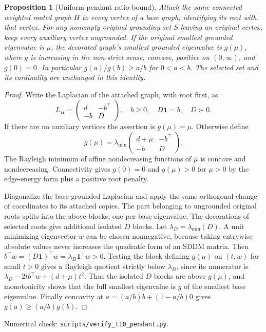 \documentclass[11pt]{article}
\newtheorem{proposition}[theorem]{Proposition}
\newcommand{\ind}{\mathbf 1}
\begin{document}
\begin{proposition}[Uniform pendant ratio bound]
\label{prop:pendantamplification}
Attach the same connected weighted rooted graph $H$ to every
vertex of a base graph, identifying its root with that vertex.
For any nonempty original grounding set $S$ leaving an original
vertex, keep every auxiliary vertex ungrounded. If the original
smallest grounded eigenvalue is $\mu$, the decorated graph's
smallest grounded eigenvalue is $g(\mu)$, where $g$ is increasing
in the non-strict sense, concave, positive on $(0,\infty)$, and
$g(0)=0$. In particular $g(a)/g(b)\geq a/b$ for $0<a<b$.
The selected set and its cardinality are unchanged in this identity.
\end{proposition}
\begin{proof}
Write the Laplacian of the attached graph, with root first, as
\[
 L_H=\begin{pmatrix}d&-b^\top\\-b&D\end{pmatrix},\quad
 b\geq0,\quad D\ind=b,\quad D\succ0.
\]
If there are no auxiliary vertices the assertion is $g(\mu)=\mu$.
Otherwise define
\[
 g(\mu)=\lambda_{\min}
 \begin{pmatrix}d+\mu&-b^\top\\-b&D\end{pmatrix}.
\]
The Rayleigh minimum of affine nondecreasing functions of $\mu$
is concave and nondecreasing. Connectivity gives $g(0)=0$ and
$g(\mu)>0$ for $\mu>0$ by the edge-energy form plus a positive
root penalty.

Diagonalize the base grounded Laplacian and apply the same
orthogonal change of coordinates to its attached copies. The
part belonging to ungrounded original roots splits into the
above blocks, one per base eigenvalue. The decorations of
selected roots give additional isolated $D$ blocks.
Let $\lambda_D=\lambda_{\min}(D)$. A unit minimizing eigenvector
$w$ can be chosen nonnegative, because taking entrywise absolute
values never increases the quadratic form of an SDDM matrix.
Then $b^\top w=(D\ind)^\top w=\lambda_D\ind^\top w>0$.
Testing the block defining $g(\mu)$ on $(t,w)$ for small $t>0$
gives a Rayleigh quotient strictly below $\lambda_D$, since
its numerator is $\lambda_D-2t b^\top w+(d+\mu)t^2$.
Thus the isolated $D$ blocks are above $g(\mu)$, and monotonicity
shows that the full smallest eigenvalue is $g$ of the smallest
base eigenvalue. Finally concavity at
$a=(a/b)b+(1-a/b)0$ gives $g(a)\geq(a/b)g(b)$.
\end{proof}
\noindent Numerical check: \texttt{scripts/verify\_t10\_pendant.py}.
\end{document}

